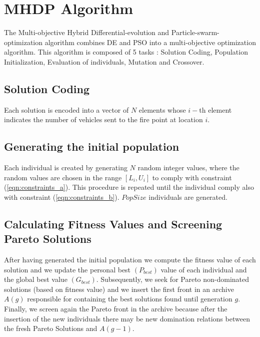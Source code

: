 \section{MHDP Algorithm}
The Multi-objective Hybrid Differential-evolution and Particle-swarm-optimization algorithm combines DE and PSO into a multi-objective optimization algorithm. 
This algorithm is composed of 5 tasks : Solution Coding, Population Initialization, Evaluation of individuals, Mutation and Crossover.
\subsection{Solution Coding}
Each solution is encoded into a vector of $N$ elements whose $i-$th element indicates the number of vehicles sent to the fire point at location $i$.
\subsection{Generating the initial population}
Each individual is created by generating $N$ random integer values, where the random values are chosen in the range \([L_i, U_i]\) to comply with constraint (\ref{eqn:constraints_a}). 
This procedure is repeated until the individual comply also with constraint (\ref{eqn:constraints_b}).
$PopSize$ individuals are generated.
\subsection{Calculating Fitness Values and Screening Pareto Solutions}
After having generated the initial population we compute the fitness value of each solution and we update the personal best \((P_{best})\) value of each individual and the global best value \((G_{best})\).
Subsequently, we seek for Pareto non-dominated solutions (based on fitness value) and we insert the first front in an archive \(A(g)\) responsible for containing the best solutions found until generation \(g\).
Finally, we screen again the Pareto front in the archive because after the insertion of the new individuals there may be new domination relations between the fresh Pareto Solutions and $A(g-1)$.
